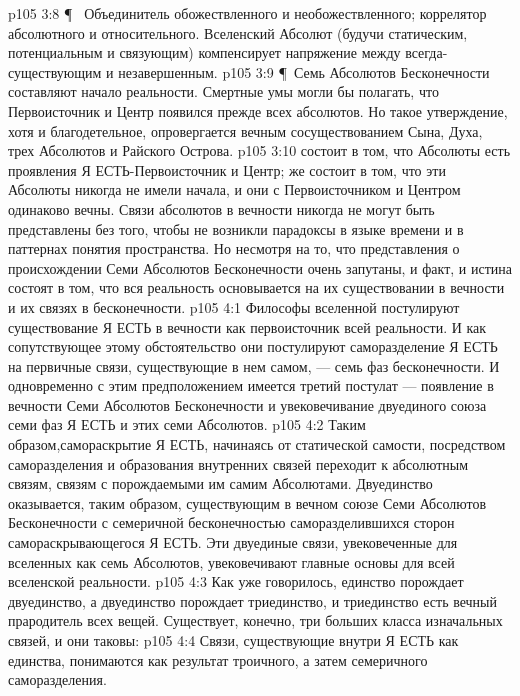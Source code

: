 \vs p105 3:8 \P\ \bibnobreakspace {} Объединитель обожествленного и необожествленного; коррелятор абсолютного и относительного. Вселенский Абсолют (будучи статическим, потенциальным и связующим) компенсирует напряжение между всегда\hyp{}существующим и незавершенным.
\vs p105 3:9 \P\ Семь Абсолютов Бесконечности составляют начало реальности. Смертные умы могли бы полагать, что Первоисточник и Центр появился прежде всех абсолютов. Но такое утверждение, хотя и благодетельное, опровергается вечным сосуществованием Сына, Духа, трех Абсолютов и Райского Острова.
\vs p105 3:10  состоит в том, что Абсолюты есть проявления Я ЕСТЬ\hyp{}Первоисточник и Центр;  же состоит в том, что эти Абсолюты никогда не имели начала, и они с Первоисточником и Центром одинаково вечны. Связи абсолютов в вечности никогда не могут быть представлены без того, чтобы не возникли парадоксы в языке времени и в паттернах понятия пространства. Но несмотря на то, что представления о происхождении Семи Абсолютов Бесконечности очень запутаны, и факт, и истина состоят в том, что вся реальность основывается на их существовании в вечности и их связях в бесконечности.
\vs p105 4:1 Философы вселенной постулируют существование Я ЕСТЬ в вечности как первоисточник всей реальности. И как сопутствующее этому обстоятельство они постулируют саморазделение Я ЕСТЬ на первичные связи, существующие в нем самом, --- семь фаз бесконечности. И одновременно с этим предположением имеется третий постулат --- появление в вечности Семи Абсолютов Бесконечности и увековечивание двуединого союза семи фаз Я ЕСТЬ и этих семи Абсолютов.
\vs p105 4:2 Таким образом,самораскрытие Я ЕСТЬ, начинаясь от статической самости, посредством саморазделения и образования внутренних связей переходит к абсолютным связям, связям с порождаемыми им самим Абсолютами. Двуединство оказывается, таким образом, существующим в вечном союзе Семи Абсолютов Бесконечности с семеричной бесконечностью саморазделившихся сторон самораскрывающегося Я ЕСТЬ. Эти двуединые связи, увековеченные для вселенных как семь Абсолютов, увековечивают главные основы для всей вселенской реальности.
\vs p105 4:3 Как уже говорилось, единство порождает двуединство, а двуединство порождает триединство, и триединство есть вечный прародитель всех вещей. Существует, конечно, три больших класса изначальных связей, и они таковы:
\vs p105 4:4 \bibnobreakspace {} Связи, существующие внутри Я ЕСТЬ как единства, понимаются как результат троичного, а затем семеричного саморазделения.
